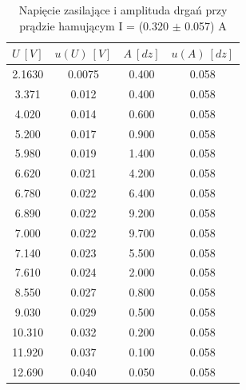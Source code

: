 \documentclass[12pt, a4paper, oneside]{article}
\begin{document}
\begin{table}[h]
  \centering
  \caption{Napięcie zasilające i amplituda drgań przy prądzie hamującym I = (0.320 $\pm$ 0.057) A}
    \begin{tabular}{|c|c|c|c|}\hline
    $U~[V]$ & $u(U)~[V]$ & $A~[dz]$ & $u(A)~[dz]$ \\\hline
    2.1630 & 0.0075 & 0.400 & 0.058 \\\hline
    3.371 & 0.012 & 0.400 & 0.058 \\\hline
    4.020 & 0.014 & 0.600 & 0.058 \\\hline
    5.200 & 0.017 & 0.900 & 0.058 \\\hline
    5.980 & 0.019 & 1.400 & 0.058 \\\hline
    6.620 & 0.021 & 4.200 & 0.058 \\\hline
    6.780 & 0.022 & 6.400 & 0.058 \\\hline
    6.890 & 0.022 & 9.200 & 0.058 \\\hline
    7.000 & 0.022 & 9.700 & 0.058 \\\hline
    7.140 & 0.023 & 5.500 & 0.058 \\\hline
    7.610 & 0.024 & 2.000 & 0.058 \\\hline
    8.550 & 0.027 & 0.800 & 0.058 \\\hline
    9.030 & 0.029 & 0.500 & 0.058 \\\hline
    10.310 & 0.032 & 0.200 & 0.058 \\\hline
    11.920 & 0.037 & 0.100 & 0.058 \\\hline
    12.690 & 0.040 & 0.050 & 0.058 \\\hline
    \end{tabular}%
  \label{tab:addlabel}%
\end{table}%
\end{document}
